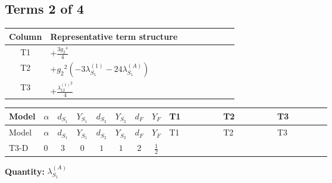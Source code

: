 \documentclass[8pt]{article}
\begin{document}
\begin{landscape}
\subsection*{Terms 2 of 4}
\begin{center}
\begin{tabular}{@{}c >{\raggedright\arraybackslash}p{0.82\linewidth}@{}}
\toprule
Column & Representative term structure \\
\midrule
T1 & \(\displaystyle +\frac{3 {g_2}^4}{4}\) \\
\midrule
T2 & \(\displaystyle +{g_2}^2 (-3 {\lambda_{S_1}^{(1)}}-24 {\lambda_{S_1}^{(A)}})\) \\
\midrule
T3 & \(\displaystyle +\frac{{\lambda_{12}^{(1)}}^2}{4}\) \\
\midrule
\bottomrule
\end{tabular}
\end{center}
\smallskip
\tiny
\begin{longtable}{@{}llcccccc >{\raggedright\arraybackslash}p{0.21\linewidth} >{\raggedright\arraybackslash}p{0.21\linewidth} >{\raggedright\arraybackslash}p{0.21\linewidth}@{}}
\toprule
Model & $\alpha$ & $d_{S_1}$ & $Y_{S_1}$ & $d_{S_2}$ & $Y_{S_2}$ & $d_F$ & $Y_F$ & T1 & T2 & T3 \\
\midrule
\endfirsthead
\toprule
Model & $\alpha$ & $d_{S_1}$ & $Y_{S_1}$ & $d_{S_2}$ & $Y_{S_2}$ & $d_F$ & $Y_F$ & T1 & T2 & T3 \\
\midrule
\endhead
T3-D & $0$ & $3$ & $0$ & $1$ & $1$ & $2$ & $\frac{1}{2}$ & \scriptsize\adjustbox{max width=\linewidth}{$\begin{gathered} +\frac{3 {g_2}^4}{4}\end{gathered}$} & \scriptsize\adjustbox{max width=\linewidth}{$\begin{gathered} +{g_2}^2 (-3 {\lambda_{S_1}^{(1)}}-24 {\lambda_{S_1}^{(A)}})\end{gathered}$} & \scriptsize\adjustbox{max width=\linewidth}{$\begin{gathered} +\frac{{\lambda_{12}^{(1)}}^2}{4}\end{gathered}$} \\
\midrule
\bottomrule
\end{longtable}
\clearpage
\noindent\textbf{Quantity: }$\lambda_{S_1}^{(A)}$\par\smallskip

\end{landscape}
\end{document}
